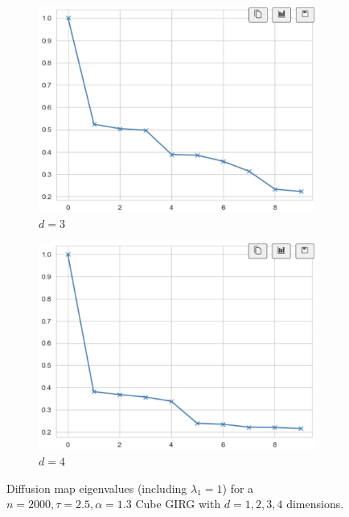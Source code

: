 \begin{figure}
    \begin{subfigure}{0.49\textwidth}
      \centering
      \includegraphics[width=\linewidth]{figures/diffmap_3d.png}
      \caption{$d=3$}
    \end{subfigure}
    \hfill
    \begin{subfigure}{0.49\textwidth}
      \centering
      \includegraphics[width=\linewidth]{figures/diffmap_4d.png}
      \caption{$d=4$}
      \label{fig:cube_diffmaps_d4}
    \end{subfigure}
  
    \caption{Diffusion map eigenvalues (including $\lambda_1 = 1$) for a $n=2000, \tau=2.5, \alpha=1.3$ Cube GIRG with $d=1,2,3,4$ dimensions.}
    \label{fig:cube_diffmaps_d1to4}
\end{figure}


